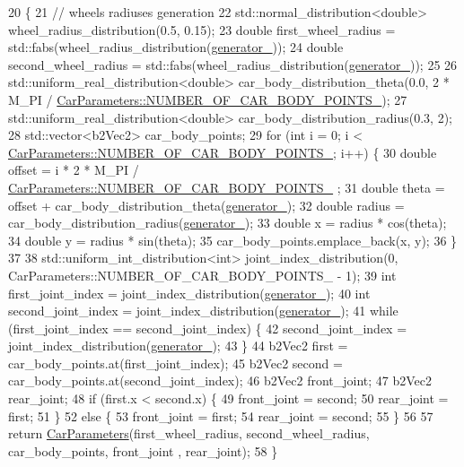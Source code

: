 \begin{DoxyCode}
20                                                                    \{
21     \textcolor{comment}{// wheels radiuses generation}
22     std::normal\_distribution<double> wheel\_radius\_distribution(0.5, 0.15);
23     \textcolor{keywordtype}{double} first\_wheel\_radius = std::fabs(wheel\_radius\_distribution(\hyperlink{classEvolutionaryAlgorithm_adbd823d385ad95bf20496fd2fc25ccde}{generator\_}));
24     \textcolor{keywordtype}{double} second\_wheel\_radius = std::fabs(wheel\_radius\_distribution(\hyperlink{classEvolutionaryAlgorithm_adbd823d385ad95bf20496fd2fc25ccde}{generator\_}));
25 
26     std::uniform\_real\_distribution<double> car\_body\_distribution\_theta(0.0, 2 * M\_PI / 
      \hyperlink{classCarParameters_a9cd45ac0f506d33d551c86eff1e0fa05}{CarParameters::NUMBER\_OF\_CAR\_BODY\_POINTS\_});
27     std::uniform\_real\_distribution<double> car\_body\_distribution\_radius(0.3, 2);
28     std::vector<b2Vec2> car\_body\_points;
29     \textcolor{keywordflow}{for} (\textcolor{keywordtype}{int} i = 0; i < \hyperlink{classCarParameters_a9cd45ac0f506d33d551c86eff1e0fa05}{CarParameters::NUMBER\_OF\_CAR\_BODY\_POINTS\_};
       i++) \{
30         \textcolor{keywordtype}{double} offset = i * 2 * M\_PI / \hyperlink{classCarParameters_a9cd45ac0f506d33d551c86eff1e0fa05}{CarParameters::NUMBER\_OF\_CAR\_BODY\_POINTS\_}
      ;
31         \textcolor{keywordtype}{double} theta = offset + car\_body\_distribution\_theta(\hyperlink{classEvolutionaryAlgorithm_adbd823d385ad95bf20496fd2fc25ccde}{generator\_});
32         \textcolor{keywordtype}{double} radius = car\_body\_distribution\_radius(\hyperlink{classEvolutionaryAlgorithm_adbd823d385ad95bf20496fd2fc25ccde}{generator\_});
33         \textcolor{keywordtype}{double} x = radius * cos(theta);
34         \textcolor{keywordtype}{double} y = radius * sin(theta);
35         car\_body\_points.emplace\_back(x, y);
36     \}
37 
38     std::uniform\_int\_distribution<int> joint\_index\_distribution(0, 
      CarParameters::NUMBER\_OF\_CAR\_BODY\_POINTS\_ - 1);
39     \textcolor{keywordtype}{int} first\_joint\_index = joint\_index\_distribution(\hyperlink{classEvolutionaryAlgorithm_adbd823d385ad95bf20496fd2fc25ccde}{generator\_});
40     \textcolor{keywordtype}{int} second\_joint\_index = joint\_index\_distribution(\hyperlink{classEvolutionaryAlgorithm_adbd823d385ad95bf20496fd2fc25ccde}{generator\_});
41     \textcolor{keywordflow}{while} (first\_joint\_index == second\_joint\_index) \{
42         second\_joint\_index = joint\_index\_distribution(\hyperlink{classEvolutionaryAlgorithm_adbd823d385ad95bf20496fd2fc25ccde}{generator\_});
43     \}
44     b2Vec2 first = car\_body\_points.at(first\_joint\_index);
45     b2Vec2 second = car\_body\_points.at(second\_joint\_index);
46     b2Vec2 front\_joint;
47     b2Vec2 rear\_joint;
48     \textcolor{keywordflow}{if} (first.x < second.x) \{
49         front\_joint = second;
50         rear\_joint = first;
51     \}
52     \textcolor{keywordflow}{else} \{
53         front\_joint = first;
54         rear\_joint = second;
55     \}
56 
57     \textcolor{keywordflow}{return} \hyperlink{classCarParameters}{CarParameters}(first\_wheel\_radius, second\_wheel\_radius, car\_body\_points, front\_joint
      , rear\_joint);
58 \}
\end{DoxyCode}
